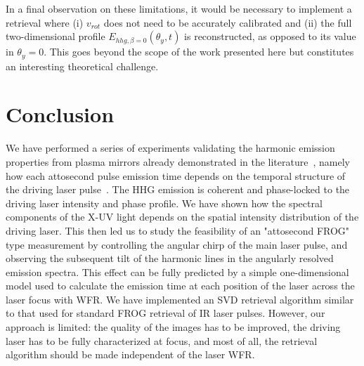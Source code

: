 \noindent In a final observation on these limitations, it would be necessary to implement a retrieval where (i) $v_{rot}$ does not need to be accurately calibrated and (ii) the full two-dimensional profile $E_{hhg,\beta=0}(\theta_y,t)$ is reconstructed, as opposed to its value in $\theta_y =0$. This goes beyond the scope of the work presented here but constitutes an interesting theoretical challenge.




\section{Conclusion}

We have performed a series of experiments validating the harmonic emission properties from plasma mirrors already demonstrated in the literature~\cite{thaury2010high,thaury2008coherent,TheseSylvain,TheseArnaud,theseAnto,TheseHenri}, namely how each attosecond pulse emission time depends on the temporal structure of the driving laser pulse~\cite{thaury2010high,theseAnto,TheseArnaud}. The HHG emission is coherent and phase-locked to the driving laser intensity and phase profile. We have shown how the spectral components of the X-UV light depends on the spatial intensity distribution of the driving laser. This then led us to study the feasibility of an "attosecond FROG" type measurement by controlling the angular chirp of the main laser pulse, and observing the subsequent tilt of the harmonic lines in the angularly resolved emission spectra. This effect can be fully predicted by a simple one-dimensional model used to calculate the emission time at each position of the laser across the laser focus with WFR. We have implemented an SVD retrieval algorithm similar to that used for standard FROG retrieval of IR laser pulses. However, our approach is limited: the quality of the images has to be improved, the driving laser has to be fully characterized at focus, and most of all, the retrieval algorithm should be made independent of the laser WFR. 































